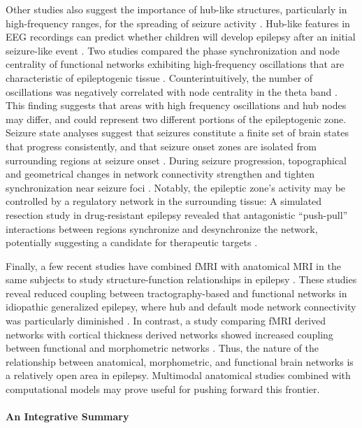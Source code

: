 \documentclass[12pt]{article}
\begin{document}
Other studies also suggest the importance of hub-like structures, particularly in high-frequency ranges, for the spreading of seizure activity \cite{amini2010comparison,varotto2012epileptogenic}. Hub-like features in EEG recordings can predict whether children will develop epilepsy after an initial seizure-like event \cite{van2013improved}. Two studies compared the phase synchronization and node centrality of functional networks exhibiting high-frequency oscillations that are characteristic of epileptogenic tissue \cite{ibrahim2013neocortical,van2013high}. Counterintuitively, the number of oscillations was negatively correlated with node centrality in the theta band \cite{van2013high}. This finding suggests that areas with high frequency oscillations and hub nodes may differ, and could represent two different portions of the epileptogenic zone. Seizure state analyses suggest that seizures constitute a finite set of brain states that progress consistently, and that seizure onset zones are isolated from surrounding regions at seizure onset \cite{burns2014network}. During seizure progression, topographical and geometrical changes in network connectivity strengthen and tighten synchronization near seizure foci \cite{khambhati2015dynamic}. Notably, the epileptic zone's activity may be controlled by a regulatory network in the surrounding tissue: A simulated resection study in drug-resistant epilepsy revealed that antagonistic ``push-pull'' interactions between regions synchronize and desynchronize the network, potentially suggesting a candidate for therapeutic targets \cite{khambhati2016virtual}. 

Finally, a few recent studies have combined fMRI with anatomical MRI in the same subjects to study structure-function relationships in epilepsy \cite{liao2013relationship,vaessen2014functional,zhang2011altered}. These studies reveal reduced coupling between tractography-based and functional networks in idiopathic generalized epilepsy, where hub and default mode network connectivity was particularly diminished \cite{zhang2011altered}. In contrast, a study comparing fMRI derived networks with cortical thickness derived networks showed increased coupling between functional and morphometric networks \cite{liao2013relationship}. Thus, the nature of the relationship between anatomical, morphometric, and functional brain networks is a relatively open area in epilepsy. Multimodal anatomical studies combined with computational models may prove useful for pushing forward this frontier. 


\paragraph{An Integrative Summary}
\end{document}
